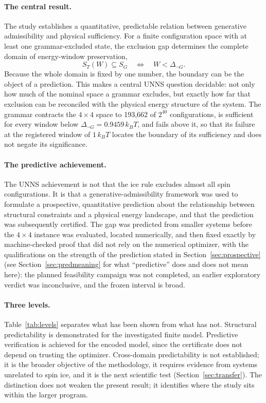 \documentclass[11pt,a4paper]{article}
\theoremstyle{plain}
\theoremstyle{definition}
\theoremstyle{remark}
\newcommand{\kBT}{k_{B}T}
\begin{document}
\paragraph{The central result.} The study establishes a quantitative, predictable relation between generative admissibility and physical sufficiency. For a finite configuration space with at least one grammar-excluded state, the exclusion gap determines the complete domain of energy-window preservation,
\[
S_T(W)\subseteq S_G\quad\Longleftrightarrow\quad W<\Delta_{\neg G}.
\]
Because the whole domain is fixed by one number, the boundary can be the object of a prediction. This makes a central UNNS question decidable: not only how much of the nominal space a grammar excludes, but exactly how far that exclusion can be reconciled with the physical energy structure of the system. The grammar contracts the $4\times4$ space to 193{,}662 of $2^{40}$ configurations, is sufficient for every window below $\Delta_{\neg G}=0.9459\,\kBT$, and fails above it, so that its failure at the registered window of $1\,\kBT$ locates the boundary of its sufficiency and does not negate its significance.

\paragraph{The predictive achievement.} The UNNS achievement is not that the ice rule excludes almost all spin configurations. It is that a generative-admissibility framework was used to formulate a prospective, quantitative prediction about the relationship between structural constraints and a physical energy landscape, and that the prediction was subsequently certified. The gap was predicted from smaller systems before the $4\times4$ instance was evaluated, located numerically, and then fixed exactly by machine-checked proof that did not rely on the numerical optimizer, with the qualifications on the strength of the prediction stated in Section~\ref{sec:prospective} (see Section~\ref{sec:predmeaning} for what ``predictive'' does and does not mean here): the planned feasibility campaign was not completed, an earlier exploratory verdict was inconclusive, and the frozen interval is broad.

\paragraph{Three levels.} Table~\ref{tab:levels} separates what has been shown from what has not. Structural predictability is demonstrated for the investigated finite model. Predictive verification is achieved for the encoded model, since the certificate does not depend on trusting the optimizer. Cross-domain predictability is not established; it is the broader objective of the methodology, it requires evidence from systems unrelated to spin ice, and it is the next scientific test (Section~\ref{sec:transfer}). The distinction does not weaken the present result; it identifies where the study sits within the larger program.
\end{document}
